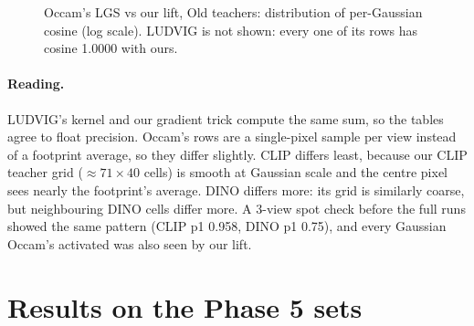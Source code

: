 \documentclass[11pt,a4paper]{article}
\begin{document}
\begin{figure}[h]
\centering
{}
\caption{Occam's LGS vs our lift, Old teachers: distribution of per-Gaussian cosine (log scale). LUDVIG is not shown:
every one of its rows has cosine 1.0000 with ours.}
\label{fig:agree}
\end{figure}

\paragraph{Reading.} LUDVIG's kernel and our gradient trick compute the same sum, so the tables agree to float
precision. Occam's rows are a single-pixel sample per view instead of a footprint average, so they differ slightly.
CLIP differs least, because our CLIP teacher grid ($\approx71\times40$ cells) is smooth at Gaussian scale and the
centre pixel sees nearly the footprint's average. DINO differs more: its grid is similarly coarse, but neighbouring
DINO cells differ more. A 3-view spot check before the full runs showed the same pattern (CLIP p1 0.958, DINO p1 0.75),
and every Gaussian Occam's activated was also seen by our lift.

\section{Results on the Phase 5 sets}\label{sec:results}
\end{document}
